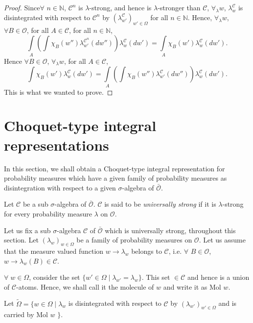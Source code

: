 \begin{proof}
Since\pageoriginale $\forall$ $n \in\mathbb{N}$, $\mathscr{C}^n$ is
$\lambda$-strong, and hence is $\lambda$-stronger than $\mathscr{C}$,
$\forall_\lambda w$, $\lambda^\mathscr{C}_w$ is disintegrated with
respect to $\mathscr{C}^n$ by $(\lambda^\mathscr{C}_{w'})_{w'
  \in\Omega}$ for all $n\in\mathbb{N}$. Hence, $\forall_\lambda w$,
$\forall B \in \mathscr{O}$, for all $A \in \mathscr{C}$, for all $n
\in \mathbb{N}$, 
$$
\int\limits_A (\int \chi_B (w'') \lambda^{\mathscr{C}^n}_{w'} (dw''))
\lambda^\mathscr{C}_w(dw') = \int\limits_A \chi_B (w')
\lambda^\mathscr{C}_w(dw') . 
$$
Hence $\forall B \in \mathscr{O}$, $\forall_\lambda w$, for all $A
\in\mathscr{C}$, 
$$
\int \chi_B (w') \lambda^\mathscr{C}_w(dw') = \int\limits_A (\int
\chi_B (w'') \lambda^\mathscr{C}_{w'} (dw''))
\lambda^\mathscr{C}_w(dw'). 
$$
This is what we wanted to prove. 
\end{proof}

\section{Choquet-type integral representations}\label{part2:chap7:sec3}

In this section, we shall obtain a Choquet-type integral
representation for probability measures which have a given family of
probability measures as disintegration with respect to a given
$\sigma$-algebra of $\bar{\mathscr{O}}$. 

\begin{defn}\label{part2:chap7:def104}
Let $\mathscr{C}$ be a sub $\sigma$-algebra of
$\bar{\mathscr{O}}$. $\mathscr{C}$ is said to be {\em universally
  strong} if it is $\lambda$-strong for every probability measure
$\lambda$ on $\mathscr{O}$. 
\end{defn}

Let us fix a sub $\sigma$-algebra $\mathscr{C}$ of $\bar{\mathscr{O}}$
which is universally strong, throughout this section. Let
$(\lambda_w)_{w \in \Omega}$ be a family of probability measures on
$\mathscr{O}$. Let us assume that the measure valued function $w \to
\lambda_w$ belongs to $\mathscr{C}$, i.e. $\forall$ $B \in
\mathscr{O}$, $w \to \lambda_w (B) \in \mathscr{C}$. 

$\forall \; w \in \Omega$, consider the set $\{w' \in \Omega \mid
\lambda_{w'} = \lambda_w\}$. This set $\in \mathscr{C}$ and hence is a
union of $\mathscr{C}$-atoms. Hence, we shall call it the molecule of
$w$ and write it as Mol $w$. 

Let $\tilde{\Omega}  = \{w \in \Omega \mid \lambda_w$ is disintegrated
with respect to $\mathscr{C}$ by $(\lambda_{w'})_{w' \in \Omega}$ and
is carried by Mol $w$ $\}$.

